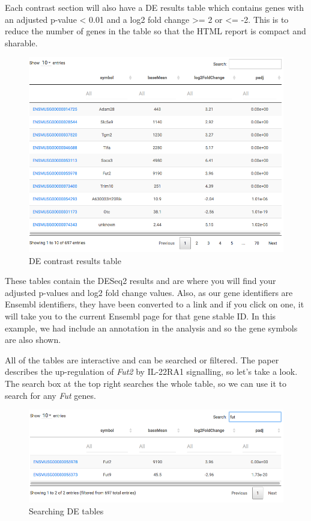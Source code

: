 \documentclass[11pt]{article}
\makeatletter
\def\maxwidth{\ifdim\Gin@nat@width>\linewidth\linewidth
    \else\Gin@nat@width\fi}
\let\Oldincludegraphics\includegraphics
\renewcommand{\includegraphics}[1]{\Oldincludegraphics[width=.8\maxwidth, height=.55\textheight, keepaspectratio]{#1}}
\makeatother
\begin{document}
    Each contrast section will also have a DE results table which contains
genes with an adjusted p-value \textless{} 0.01 and a log2 fold change
\textgreater{}= 2 or \textless{}= -2. This is to reduce the number of
genes in the table so that the HTML report is compact and sharable.

    \begin{figure}[H]
\centering
\includegraphics{images/DEtable.png}
\caption{DE contrast results table}
\end{figure}

    These tables contain the DESeq2 results and are where you will find your
adjusted p-values and log2 fold change values. Also, as our gene
identifiers are Ensembl identifiers, they have been converted to a link
and if you click on one, it will take you to the current Ensembl page
for that gene stable ID. In this example, we had include an annotation
in the analysis and so the gene symbols are also shown.

All of the tables are interactive and can be searched or filtered. The
paper describes the up-regulation of \textit{Fut2} by IL-22RA1 signalling,
so let's take a look. The search box at the top right searches the whole
table, so we can use it to search for any \textit{Fut} genes.

    \begin{figure}[H]
\centering
\includegraphics{images/DEsearch.png}
\caption{Searching DE tables}
\end{figure}
\end{document}
